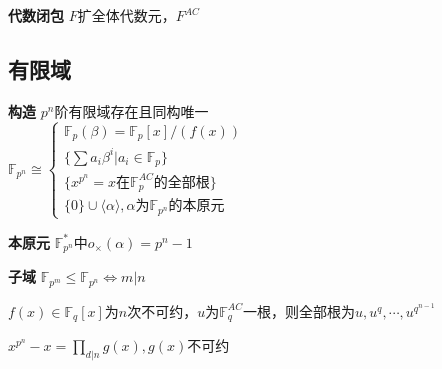 \documentclass[a4paper,10pt]{ctexart}
\newcommand*{\bb}[1]{\mathbb{#1}}
\renewcommand*{\iff}{\Leftrightarrow}
\renewcommand*{\leq}{\leqslant}
\newcommand*{\genfield}[1]{\langle #1 \rangle}
\newcommand*{\ff}[1]{\bb{F}_{#1}}
\begin{document}
\begin{multicols}{3}
    \textbf{代数闭包} $F$扩全体代数元，$F^{AC}$

    \subsection{有限域}

    \textbf{构造} $p^n$阶有限域存在且同构唯一\\
    $\ff{p^n} \cong \begin{cases}
            \ff{p}(\beta) = \ff{p}[x]/(f(x))          \\
            \{\sum a_i \beta^i | a_i \in \ff{p}\}     \\
            \{x^{p^n} = x \text{在$\ff{p}^{AC}$的全部根}\} \\
            \{0\} \cup \genfield{\alpha}, \alpha\text{为$\ff{p^n}$的本原元}
        \end{cases}$

    \textbf{本原元} $\ff{p^n}^*$中$o_\times(\alpha) = p^n - 1$

    \textbf{子域} $\ff{p^m} \leq \ff{p^n} \iff m | n$

    \begin{theorem}[多项式根]
        $f(x) \in \ff{q}[x]$为$n$次不可约，$u$为$\ff{q}^{AC}$一根，则全部根为$u, u^q,\cdots,u^{q^{n-1}}$
    \end{theorem}

    \begin{theorem}[一篮子分解]
        $x^{p^n} \! - \! x \! = \! \prod\limits_{d|n} g(x), g(x)$不可约
    \end{theorem}

\end{multicols}
\end{document}

